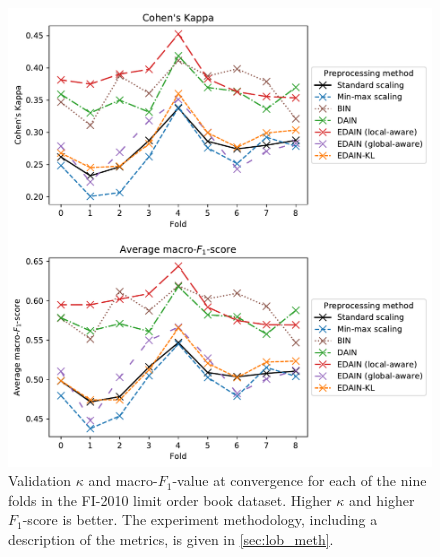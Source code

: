 \documentclass{statsmsc}
\begin{document}
{%
\begin{figure}[htp]
\begin{center}
    \includegraphics[width=\textwidth]{figures/lob_performance_per_fold.pdf}
\end{center}
\caption{
    Validation $\kappa$ and macro-$F_1$-value at convergence for each of the
    nine folds in the FI-2010 limit order book dataset.
    Higher $\kappa$ and higher $F_1$-score is better.
    The experiment methodology, including a description of the metrics,
    is given in  \cref{sec:lob_meth}.
}
\label{fig:lob_folds}
\end{figure}

}
\end{document}
